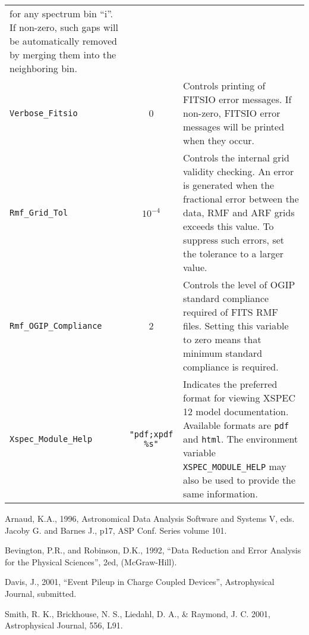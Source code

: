 \documentclass{book}
\newif\ifpdf
\begin{document}
\begin{center}
\begin{tabular}{|l|c|p{3.2in}|}
for any spectrum bin ``i''.  If non-zero, such gaps will be
automatically removed by merging them into the neighboring bin.\\
{\tt Verbose\_Fitsio} & 0 & Controls printing of FITSIO error messages.  If
non-zero, FITSIO error messages will be printed when they occur.\\
{\tt Rmf\_Grid\_Tol} & $10^{-4}$ & Controls the internal grid validity
checking.  An error is generated when the
fractional error between the data, RMF and ARF grids
exceeds this value.  To suppress such errors, set the tolerance to
a larger value.\\
{\tt Rmf\_OGIP\_Compliance} & 2 & Controls the level of OGIP
standard compliance required of FITS RMF files.  Setting
this variable to zero means that minimum standard compliance
is required.\\
{\tt Xspec\_Module\_Help} & {\tt "pdf;xpdf \%s"} & Indicates
the preferred format for viewing XSPEC 12 model documentation.
Available formats are {\tt pdf} and {\tt html}.  The environment
variable {\tt XSPEC\_MODULE\_HELP} may also be used to provide
the same information.
\\
\hline
\end{tabular}
\end{center}

\clearpage        %

\begin{thebibliography}{}
\label{chap:biblio}
\ifpdf
  \pdfbookmark[-1]{Bibliography}{chap:biblio}
\fi
 Arnaud, K.A., 1996, Astronomical Data Analysis Software
and Systems V, eds. Jacoby G. and Barnes J., p17, ASP Conf. Series volume 101.

 Bevington, P.R., and Robinson, D.K., 1992, ``Data
Reduction and Error Analysis for the Physical Sciences'', 2ed,
(McGraw-Hill).

 Davis, J., 2001, ``Event Pileup in Charge Coupled
Devices'', Astrophysical Journal, submitted.


Smith, R. K., Brickhouse, N. S., Liedahl, D. A., \&
Raymond, J. C. 2001, Astrophysical Journal, 556, L91.

\end{thebibliography}

%
%

\printindex

%
%
\end{document}
